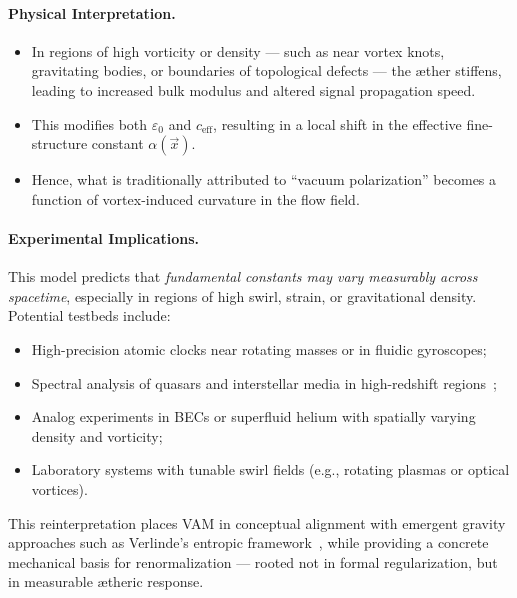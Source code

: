 \paragraph{Physical Interpretation.}
\begin{itemize}
    \item In regions of high vorticity or density — such as near vortex knots, gravitating bodies, or boundaries of topological defects — the æther stiffens, leading to increased bulk modulus and altered signal propagation speed.
    \item This modifies both \( \varepsilon_0 \) and \( c_{\text{eff}} \), resulting in a local shift in the effective fine-structure constant \( \alpha(\vec{x}) \).
    \item Hence, what is traditionally attributed to “vacuum polarization” becomes a function of vortex-induced curvature in the flow field.
\end{itemize}

\vspace{0.5em}

\paragraph{Experimental Implications.}
This model predicts that \emph{fundamental constants may vary measurably across spacetime}, especially in regions of high swirl, strain, or gravitational density. Potential testbeds include:
\begin{itemize}
    \item High-precision atomic clocks near rotating masses or in fluidic gyroscopes;
    \item Spectral analysis of quasars and interstellar media in high-redshift regions~\cite{shapiro2004variation, uzan2011varying};
    \item Analog experiments in BECs or superfluid helium with spatially varying density and vorticity;
    \item Laboratory systems with tunable swirl fields (e.g., rotating plasmas or optical vortices).
\end{itemize}

\vspace{0.5em}

This reinterpretation places VAM in conceptual alignment with emergent gravity approaches such as Verlinde’s entropic framework~\cite{verlinde2016emergent}, while providing a concrete mechanical basis for renormalization — rooted not in formal regularization, but in measurable ætheric response.